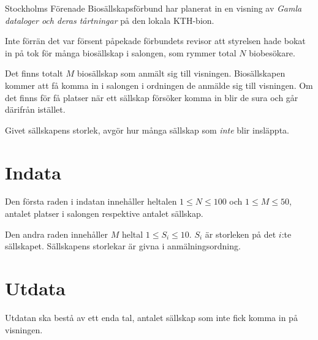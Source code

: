 
Stockholms Förenade Biosällskapsförbund har planerat in en visning av \emph{Gamla dataloger och deras tårtningar} på den lokala KTH-bion.

Inte förrän det var försent påpekade förbundets revisor att styrelsen hade bokat in på tok för många biosällskap i salongen, som rymmer total $N$ biobesökare.

Det finns totalt $M$ biosällskap som anmält sig till visningen. Biosällskapen kommer att få komma in i salongen i ordningen de anmälde sig till visningen. Om det finns för få platser när ett sällskap försöker komma in blir de sura och går därifrån istället.

Givet sällskapens storlek, avgör hur många sällskap som \emph{inte} blir insläppta.

\section*{Indata}
Den första raden i indatan innehåller heltalen $1 \le N \le 100$ och $1 \le M \le 50$, antalet platser i salongen respektive antalet sällskap.

Den andra raden innehåller $M$ heltal $1 \le S_i \le 10$. $S_i$ är storleken på det $i$:te sällskapet. Sällskapens storlekar är givna i anmälningsordning.


\section*{Utdata}
Utdatan ska bestå av ett enda tal, antalet sällskap som inte fick komma in på visningen.
